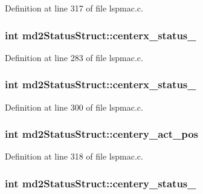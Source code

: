 Definition at line 317 of file lspmac.\-c.

\hypertarget{structmd2StatusStruct_aa619cdbd7a563408c6b825ddc4f74ebb}{
\subsubsection[{centerx\-\_\-status\-\_\-1}]{\setlength{\rightskip}{0pt plus 5cm}int md2\-Status\-Struct\-::centerx\-\_\-status\-\_}}\label{structmd2StatusStruct_aa619cdbd7a563408c6b825ddc4f74ebb}


Definition at line 283 of file lspmac.\-c.

\hypertarget{structmd2StatusStruct_ae4fad6debe138ed7815d463e83f8d0f6}{
\subsubsection[{centerx\-\_\-status\-\_\-2}]{\setlength{\rightskip}{0pt plus 5cm}int md2\-Status\-Struct\-::centerx\-\_\-status\-\_}}\label{structmd2StatusStruct_ae4fad6debe138ed7815d463e83f8d0f6}


Definition at line 300 of file lspmac.\-c.

\hypertarget{structmd2StatusStruct_a6be71a92a599d490ca808af8c7e7faa0}{
\subsubsection[{centery\-\_\-act\-\_\-pos}]{\setlength{\rightskip}{0pt plus 5cm}int md2\-Status\-Struct\-::centery\-\_\-act\-\_\-pos}}\label{structmd2StatusStruct_a6be71a92a599d490ca808af8c7e7faa0}


Definition at line 318 of file lspmac.\-c.

\hypertarget{structmd2StatusStruct_a57f65ebe28ef88f1c632d9f35d9167eb}{
\subsubsection[{centery\-\_\-status\-\_\-1}]{\setlength{\rightskip}{0pt plus 5cm}int md2\-Status\-Struct\-::centery\-\_\-status\-\_}}\label{structmd2StatusStruct_a57f65ebe28ef88f1c632d9f35d9167eb}


